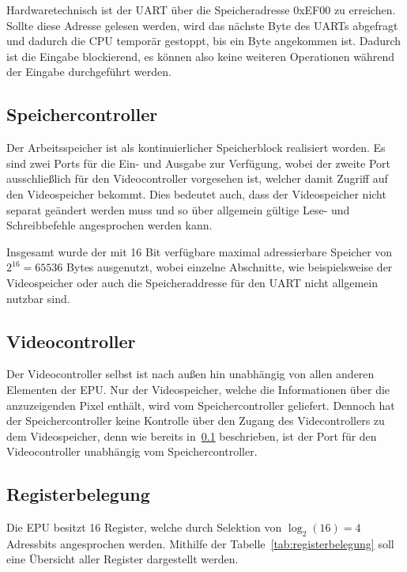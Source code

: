 Hardwaretechnisch ist der UART über die Speicheradresse 0xEF00 zu erreichen.
Sollte diese Adresse gelesen werden, wird das nächste Byte des UARTs abgefragt
und dadurch die CPU temporär gestoppt, bis ein Byte angekommen ist. Dadurch ist
die Eingabe blockierend, es können also keine weiteren Operationen während der
Eingabe durchgeführt werden.
\subsection{Speichercontroller}
\label{s:memorycontrol}
Der Arbeitsspeicher ist als kontinuierlicher Speicherblock realisiert worden. Es
sind zwei Ports für die Ein- und Ausgabe zur Verfügung, wobei der zweite Port
ausschließlich für den Videocontroller vorgesehen ist, welcher damit Zugriff auf
den Videospeicher bekommt. Dies bedeutet auch, dass der Videospeicher nicht
separat geändert werden muss und so über allgemein gültige Lese- und
Schreibbefehle angesprochen werden kann.

Insgesamt wurde der mit 16 Bit verfügbare maximal adressierbare Speicher von
$2^{16} = 65536$ Bytes ausgenutzt, wobei einzelne Abschnitte, wie beispielsweise
der Videospeicher oder auch die Speicheraddresse für den UART nicht allgemein nutzbar sind.
\subsection{Videocontroller}
\label{s:videocontrol}
Der Videocontroller selbst ist nach außen hin unabhängig von allen anderen
Elementen der \ac{EPU}. Nur der Videospeicher, welche die Informationen über die
anzuzeigenden Pixel enthält, wird vom Speichercontroller geliefert. Dennoch hat
der Speichercontroller keine Kontrolle über den Zugang des Videcontrollers zu
dem Videospeicher, denn wie bereits in~\ref{s:memorycontrol} beschrieben, ist der
Port für den Videocontroller unabhängig vom Speichercontroller.
\pagebreak
\subsection{Registerbelegung}
Die \ac{EPU} besitzt 16 Register, welche durch Selektion von $\log_2(16) = 4$
Adressbits angesprochen werden. Mithilfe der Tabelle~\ref{tab:registerbelegung}
soll eine Übersicht aller Register dargestellt werden.

